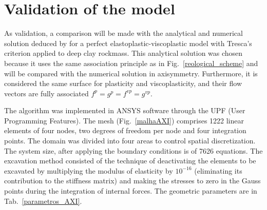 \documentclass[Journal,letterpaper]{ascelike-new}
\begin{document}
\section{Validation of the model}

As validation, a comparison will be made with the analytical and numerical solution deduced by \cite{piepi1995} for a perfect elastoplastic-viscoplastic model with Tresca’s criterion applied to deep clay rockmass. This analytical solution was chosen because it uses the same association principle as in Fig.~\ref{reological_scheme} and will be compared with the numerical solution in axisymmetry. Furthermore, it is considered the same surface for plasticity and viscoplasticity, and their flow vectors are fully associated  $f^p = g^{p} = f^{vp} = g^{vp}$. 

The algorithm was implemented in ANSYS software through the UPF (User Programming Features). The mesh (Fig.~\ref{malhaAXI}) comprises 1222 linear elements of four nodes, two degrees of freedom per node and four integration points. The domain was divided into four areas to control spatial discretization. The system size, after applying the boundary conditions is of 7626 equations. The excavation method consisted of the technique of deactivating the elements to be excavated by multiplying the modulus of elasticity by $10^{-16}$ (eliminating its contribution to the stiffness matrix) and making the stresses to zero in the Gauss points during the integration of internal forces. The geometric parameters are in Tab.~\ref{parametros_AXI}.
\end{document}
